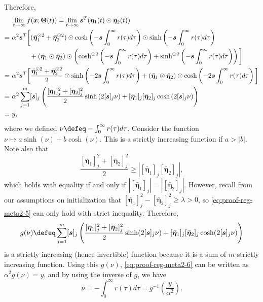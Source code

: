 \documentclass{article} %
\def\vs{{\bm{s}}}
\def\vx{{\bm{x}}}
\newcommand{\bTheta}{\bm{\Theta}}
\newcommand{\veta}{{\bm{\eta}}}
\begin{document}
Therefore,
\begin{align}
    &~\lim_{t \to \infty} f(\vx; \bTheta(t)) = \lim_{t \to \infty} \vs^T (\veta_1(t) \odot \veta_2(t))\notag \\
    =&~ \alpha^2 \vs^T \bigg[ 
    (\bar \veta_1^{\odot 2} + \bar \veta_2^{\odot 2}) 
    \odot \cosh \left (-\vs \int_0^\infty r(\tau)d\tau \right) 
    \odot \sinh \left (-\vs \int_0^\infty r(\tau)d\tau \right)\notag\\
    &\quad\quad\quad+(\bar \veta_1 \odot \bar \veta_2) \odot \left ( \cosh^{\odot 2} \left (-\vs \int_0^\infty r(\tau)d\tau \right) + \sinh^{\odot 2} \left (-\vs \int_0^\infty r(\tau)d\tau \right)\right) \bigg ]\notag\\
    =&~ \alpha^2 \vs^T \bigg [
    \frac{\bar \veta_1^{\odot 2} + \bar \veta_2^{\odot 2}}{2}
    \odot \sinh \left (-2 \vs \int_0^\infty r(\tau)d\tau \right) 
    +(\bar \veta_1 \odot \bar \veta_2) 
    \odot \cosh \left (-2 \vs \int_0^\infty r(\tau)d\tau \right) 
    \bigg ]\notag\\
    =&~\alpha^2 \sum_{j=1}^m 
    [\vs]_j \left (\frac{[\bar \veta_1]_j^2+[\bar \veta_2]_j^2}{2} \sinh\left (2[\vs]_j \nu \right ) 
    + [\bar \veta_1]_j [\bar \veta_2]_j \cosh\left (2[\vs]_j \nu \right) \right)\notag\\
    =&~y,\label{eq:proof-reg-meta2-6}
\end{align}
where we defined $\nu \defeq -\int_0^\infty r(\tau) d \tau$.
Consider the function $\nu \mapsto a \sinh(\nu) + b\cosh(\nu)$. This is a strictly increasing function if $a>|b|$. Note also that 
\begin{equation}
\label{eq:proof-reg-meta2-5}
    \frac{[\bar \veta_1]_j^2 + [\bar \veta_2]_j^2}{2} \geq |[\bar \veta_1]_j [\bar \veta_2]_j|,
\end{equation}
which holds with equality if and only if $|[\bar \veta_1]_j| = |[\bar \veta_2]_j|$. However, recall from our assumptions on initialization that
$[\bar \veta_1]_j^2-[\bar \veta_2]_j^2 \geq \lambda > 0$, so \eqref{eq:proof-reg-meta2-5} can only hold with strict inequality. Therefore,
\begin{equation*}
    g(\nu) \defeq \sum_{j=1}^m [\vs]_j \left (\frac{[\bar \veta_1]_j^2+[\bar \veta_2]_j^2}{2} \sinh(2[\vs]_j \nu) + [\bar \veta_1]_j [\bar \veta_2]_j \cosh(2[\vs]_j \nu) \right)
\end{equation*}
is a strictly increasing (hence invertible) function because it is a sum of $m$ strictly increasing function. Using this $g(\nu)$, \eqref{eq:proof-reg-meta2-6} can be written as $\alpha^2 g(\nu) = y$, and by using the inverse of $g$, we have \begin{equation}
\label{eq:proof-reg-meta2-8}
    \nu = - \int_0^\infty r(\tau) d\tau = g^{-1} \left( \frac{y}{\alpha^2} \right ).
\end{equation}
\end{document}

